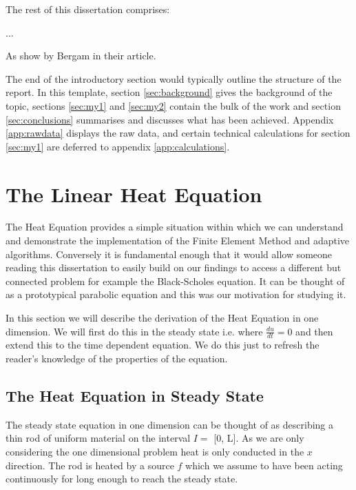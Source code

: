 \documentclass{uonmathreport}
\theoremstyle{definition}
\theoremstyle{problem}
\theoremstyle{theorem}
\begin{document}
The rest of this dissertation comprises:
 
...

As show by Bergam \cite{Bergam} in their article.



The end of the introductory section would typically outline the
structure of the report. In this template, section \ref{sec:background}
gives the background of the topic, sections \ref{sec:my1} and
\ref{sec:my2} contain the bulk of the work and section
\ref{sec:conclusions} summarises and discusses what has been
achieved. Appendix \ref{app:rawdata} displays the raw data, and
certain technical calculations for section \ref{sec:my1} are deferred
to appendix \ref{app:calculations}.

\newpage

\section{The Linear Heat Equation} \label{sec:Heat Equation}

The Heat Equation provides a simple situation within which we can understand and demonstrate the implementation of the Finite Element Method and adaptive algorithms. Conversely it is fundamental enough that it would allow someone reading this dissertation to easily build on our findings to access a different but connected problem for example the Black-Scholes equation. It can be thought of as a prototypical parabolic equation and this was our motivation for studying it.

In this section we will describe the derivation of the Heat Equation in one dimension. We will first do this in the steady state i.e. where $\frac{du}{dt}=0$ and then extend this to the time dependent equation. We do this just to refresh the reader's knowledge of the properties of the equation. 

\subsection{The Heat Equation in Steady State} \label{subsec:Steady State}

The steady state equation in one dimension can be thought of as describing a thin rod of uniform material on the interval $I =$ [0, L]. As we are only considering the one dimensional problem heat is only conducted in the $x$ direction. The rod is heated by a source $f$ which we assume to have been acting continuously for long enough to reach the steady state. 
\end{document}
